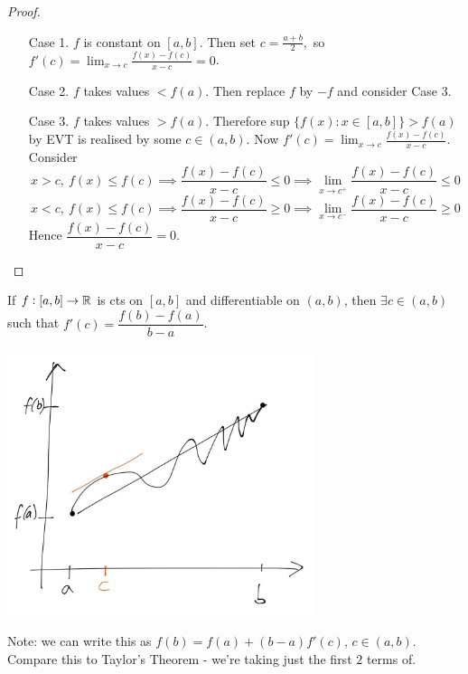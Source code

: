 \begin{proof}~
\begin{enumerate}
\item[Case 1.] $f$ is constant on $[a,b]$. Then set $c = \frac{a+b}{2},$ so $f'(c) = \lim_{x\to c}\frac{f(x) - f(c)}{x-c} = 0$.
\item[Case 2.] $f$ takes values $< f(a)$. Then replace $f$ by $-f$ and consider Case 3.
\item[Case 3.] $f$ takes values $> f(a)$. Therefore sup $\{f(x): x \in [a,b]\} > f(a)$ by EVT is realised by some $c \in (a,b)$. Now $f'(c) = \lim_{x\to c} \frac{f(x) - f(c)}{x-c}$. Consider
 \[x > c,~f(x) \leq f(c) \implies \frac{f(x) - f(c)}{x-c} \leq 0 \implies \lim_{x \to c^{+}} \frac{f(x) - f(c)}{x-c} \leq 0\]
 \[x < c,~f(x) \leq f(c) \implies \frac{f(x) - f(c)}{x-c} \geq 0 \implies \lim_{x \to c^{-}} \frac{f(x) - f(c)}{x-c} \geq 0 \] 
 Hence  $\dfrac{f(x) - f(c)}{x-c} = 0$.\qedhere 
\end{enumerate}
	
\end{proof}
\pagebreak

\vspace*{5pt}


\begin{theorem}
If $f:[a,b] \to \mathbb{R}$ is cts on $[a,b]$ and differentiable on $(a,b)$, then $\exists c \in (a,b)$ such that $f'(c) = \dfrac{f(b) - f(a)}{b-a}$.
\end{theorem}


\begin{center}
\includegraphics[width = 9cm]{mvt1.jpg}
\end{center}
Note: we can write this as $f(b) = f(a) + (b-a)f'(c)$, $c \in (a,b)$. Compare this to Taylor's Theorem - we're taking just the first $2$ terms of.

